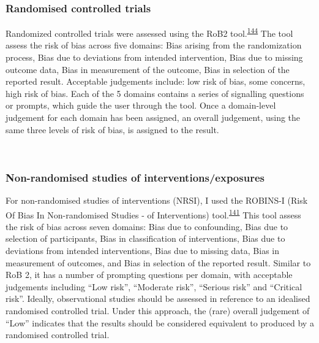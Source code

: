 \documentclass[a4paper, twoside]{templates/ociamthesis}
\begin{document}
\hypertarget{randomised-controlled-trials-1}{%
\subsubsection{Randomised controlled trials}\label{randomised-controlled-trials-1}}

Randomized controlled trials were assessed using the RoB2 tool.\textsuperscript{\protect\hyperlink{ref-sterne2019}{144}} The tool assess the risk of bias across five domains: Bias arising from the randomization process, Bias due to deviations from intended intervention, Bias due to missing outcome data, Bias in measurement of the outcome, Bias in selection of the reported result. Acceptable judgements include: low risk of bias, some concerns, high risk of bias. Each of the 5 domains contains a series of signalling questions or prompts, which guide the user through the tool. Once a domain-level judgement for each domain has been assigned, an overall judgement, using the same three levels of risk of bias, is assigned to the result.

~

\hypertarget{non-randomised-studies-of-interventionsexposures}{%
\subsubsection{Non-randomised studies of interventions/exposures}\label{non-randomised-studies-of-interventionsexposures}}

For non-randomised studies of interventions (NRSI), I used the ROBINS-I (Risk Of Bias In Non-randomised Studies - of Interventions) tool.\textsuperscript{\protect\hyperlink{ref-sterne2016}{141}} This tool assess the risk of bias across seven domains: Bias due to confounding, Bias due to selection of participants, Bias in classification of interventions, Bias due to deviations from intended interventions, Bias due to missing data, Bias in measurement of outcomes, and Bias in selection of the reported result. Similar to RoB 2, it has a number of prompting questions per domain, with acceptable judgements including ``Low risk'', ``Moderate risk'', ``Serious risk'' and ``Critical risk''. Ideally, observational studies should be assessed in reference to an idealised randomised controlled trial. Under this approach, the (rare) overall judgement of ``Low'' indicates that the results should be considered equivalent to produced by a randomised controlled trial.
\end{document}

